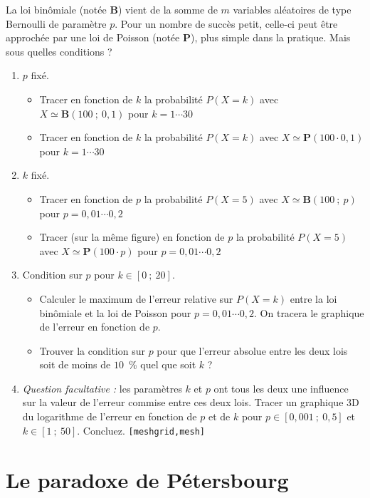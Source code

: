 \documentclass[a4paper,12pt]{article}
\begin{document}
La loi binômiale (notée $\mathbf{B}$) vient de la somme de $m$ variables aléatoires de type Bernoulli de paramètre $p$. Pour un nombre de succès petit, celle-ci peut être
approchée par une loi de Poisson (notée $\mathbf{P}$), plus simple dans la pratique. Mais sous quelles conditions ?
\begin{enumerate}
 \item $p$ fixé.
\begin{itemize}
 \item Tracer en fonction de $k$ la probabilité $P(X=k) $ avec $X
 \simeq \mathbf{B}(100\ ;\ 0,1)$ pour $ k=1 \cdots 30$
 \item Tracer en fonction de $k$ la probabilité $P(X=k)$ avec $X
 \simeq \mathbf{P}(100 \cdot 0,1)$ pour $ k=1 \cdots 30$\end{itemize}
\item $k$ fixé.
\begin{itemize}
 \item Tracer en fonction de $p$ la probabilité $P(X=5) $ avec $X
 \simeq \mathbf{B}(100\ ;\ p)$ pour $ p=0,01 \cdots 0,2$
 \item Tracer (sur la même figure) en fonction de $p$ la probabilité $P(X=5)$ avec $X
 \simeq \mathbf{P}(100 \cdot p)$ pour $ p=0,01 \cdots 0,2$
\end{itemize}
\item Condition sur $p$ pour $k \in [0\ ;\ 20]$.
\begin{itemize}
 \item Calculer le maximum de l'erreur relative sur $P(X=k)$ entre la loi binômiale
et la loi de Poisson pour $ p=0,01 \cdots 0,2$. On tracera le graphique de
l'erreur en fonction de $p$.
\item Trouver la condition sur $p$ pour que l'erreur absolue entre les deux
lois soit de moins de $10$~\% quel que soit $k$ ?
\end{itemize}
\item \textit{Question facultative :} les paramètres $k$ et $p$ ont tous les deux
une influence sur la valeur de l'erreur commise entre ces deux lois. Tracer un
graphique 3D du logarithme de l'erreur en fonction de $p$ et de $k$ pour $p \in
[0,001\ ;\ 0,5]$ et $k \in [1\ ;\ 50]$. Concluez. \texttt{[meshgrid,mesh]}
 \end{enumerate}

\section{Le paradoxe de Pétersbourg}
\end{document}
